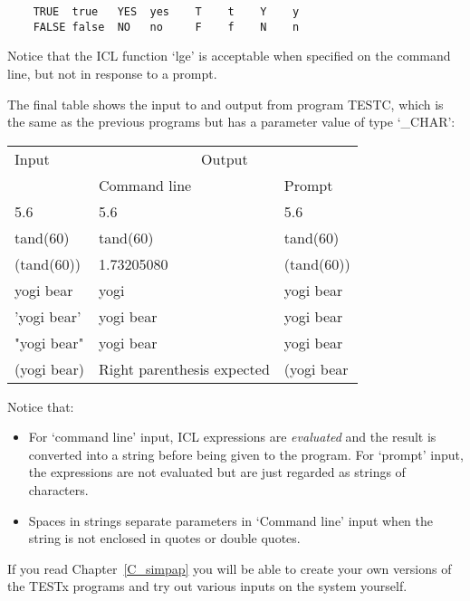 \begin{small}
\begin{verbatim}
    TRUE  true   YES  yes    T    t    Y    y
    FALSE false  NO   no     F    f    N    n
\end{verbatim}
\end{small}

Notice that the ICL function `lge' is acceptable when specified on the
command line, but not in response to a prompt.

The final table shows the input to and output from program TESTC, which
is the same as the previous programs but has a parameter value of type
`\_CHAR':
\begin{center}
\begin{tabular}{|l|l|l|}
\hline
Input & \multicolumn{2}{c|}{Output} \\ \cline{2-3}
& Command line & Prompt \\
\hline
5.6 & 5.6 & 5.6 \\
tand(60) & tand(60) & tand(60) \\
(tand(60)) & 1.73205080 & (tand(60)) \\
yogi bear & yogi & yogi bear \\
'yogi bear' & yogi bear & yogi bear \\
"yogi bear" & yogi bear & yogi bear \\
(yogi bear) & Right parenthesis expected & (yogi bear \\
\hline
\end{tabular}
\end{center}
Notice that:
\begin{itemize}
\item For `command line' input, ICL expressions are {\em evaluated} and the
result is converted into a string before being given to the program.
For `prompt' input, the expressions are not evaluated but are just regarded
as strings of characters.
\item Spaces in strings separate parameters in `Command line' input when the
string is not enclosed in quotes or double quotes.
\end{itemize}
If you read Chapter~\ref{C_simpap} you will be able to create your own
versions of the TESTx programs and try out various inputs on the system
yourself.
